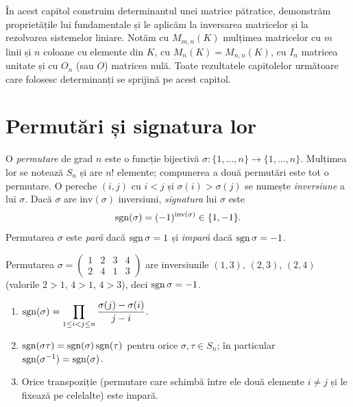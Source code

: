 În acest capitol construim determinantul unei matrice pătratice, demonstrăm proprietățile lui fundamentale și le aplicăm la inversarea matricelor și la rezolvarea sistemelor liniare. Notăm cu $M_{m,n}(K)$ mulțimea matricelor cu $m$ linii și $n$ coloane cu elemente din $K$, cu $M_n(K)=M_{n,n}(K)$, cu $I_n$ matricea unitate și cu $O_n$ (sau $O$) matricea nulă. Toate rezultatele capitolelor următoare care folosesc determinanți se sprijină pe acest capitol.

\section{Permutări și signatura lor}

\begin{definitie}
O \emph{permutare} de grad $n$ este o funcție bijectivă $\sigma:\{1,\dots,n\}\to\{1,\dots,n\}$. Mulțimea lor se notează $S_n$ și are $n!$ elemente; compunerea a două permutări este tot o permutare. O pereche $(i,j)$ cu $i<j$ și $\sigma(i)>\sigma(j)$ se numește \emph{inversiune} a lui $\sigma$. Dacă $\sigma$ are $\mathrm{inv}(\sigma)$ inversiuni, \emph{signatura} lui $\sigma$ este
\[
\operatorname{sgn}(\sigma)=(-1)^{\mathrm{inv}(\sigma)}\in\{1,-1\}.
\]
Permutarea $\sigma$ este \emph{pară} dacă $\operatorname{sgn}\sigma=1$ și \emph{impară} dacă $\operatorname{sgn}\sigma=-1$.
\end{definitie}

\begin{exemplu}
Permutarea $\sigma=\begin{pmatrix}1&2&3&4\\2&4&1&3\end{pmatrix}$ are inversiunile $(1,3)$, $(2,3)$, $(2,4)$ (valorile $2>1$, $4>1$, $4>3$), deci $\operatorname{sgn}\sigma=-1$.
\end{exemplu}

\begin{propozitie}\label{prop:sgn}
\begin{enumerate}
\item $\displaystyle\operatorname{sgn}(\sigma)=\prod_{1\le i<j\le n}\frac{\sigma(j)-\sigma(i)}{j-i}$.
\item $\operatorname{sgn}(\sigma\tau)=\operatorname{sgn}(\sigma)\operatorname{sgn}(\tau)$ pentru orice $\sigma,\tau\in S_n$; în particular $\operatorname{sgn}(\sigma^{-1})=\operatorname{sgn}(\sigma)$.
\item Orice transpoziție (permutare care schimbă între ele două elemente $i\neq j$ și le fixează pe celelalte) este impară.
\end{enumerate}
\end{propozitie}

